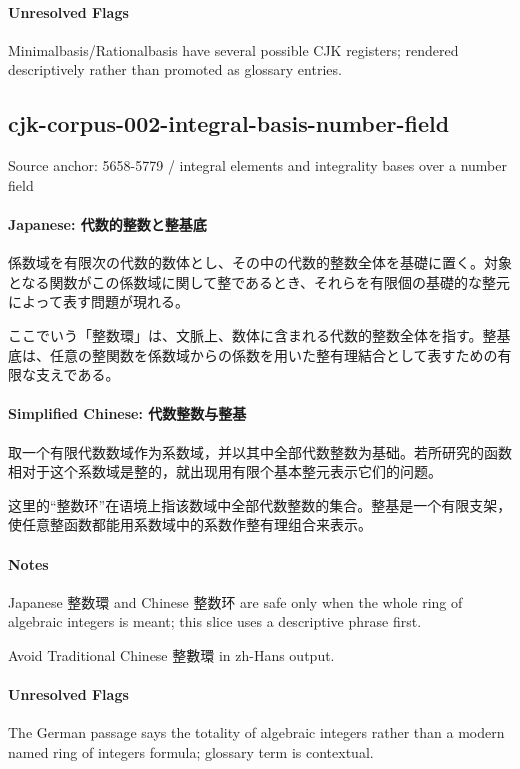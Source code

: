 \documentclass[11pt]{article}
\begin{document}
\paragraph{Unresolved Flags}
Minimalbasis/Rationalbasis have several possible CJK registers; rendered descriptively rather than promoted as glossary entries.\par
\subsection*{cjk-corpus-002-integral-basis-number-field}
Source anchor: 5658-5779 / integral elements and integrality bases over a number field
\par
\paragraph{Japanese: 代数的整数と整基底}
係数域を有限次の代数的数体とし、その中の代数的整数全体を基礎に置く。対象となる関数がこの係数域に関して整であるとき、それらを有限個の基礎的な整元によって表す問題が現れる。\par
ここでいう「整数環」は、文脈上、数体に含まれる代数的整数全体を指す。整基底は、任意の整関数を係数域からの係数を用いた整有理結合として表すための有限な支えである。\par
\paragraph{Simplified Chinese: 代数整数与整基}
取一个有限代数数域作为系数域，并以其中全部代数整数为基础。若所研究的函数相对于这个系数域是整的，就出现用有限个基本整元表示它们的问题。\par
这里的“整数环”在语境上指该数域中全部代数整数的集合。整基是一个有限支架，使任意整函数都能用系数域中的系数作整有理组合来表示。\par
\paragraph{Notes}
Japanese 整数環 and Chinese 整数环 are safe only when the whole ring of algebraic integers is meant; this slice uses a descriptive phrase first.\par
Avoid Traditional Chinese 整數環 in zh-Hans output.\par
\paragraph{Unresolved Flags}
The German passage says the totality of algebraic integers rather than a modern named ring of integers formula; glossary term is contextual.\par
\end{document}
